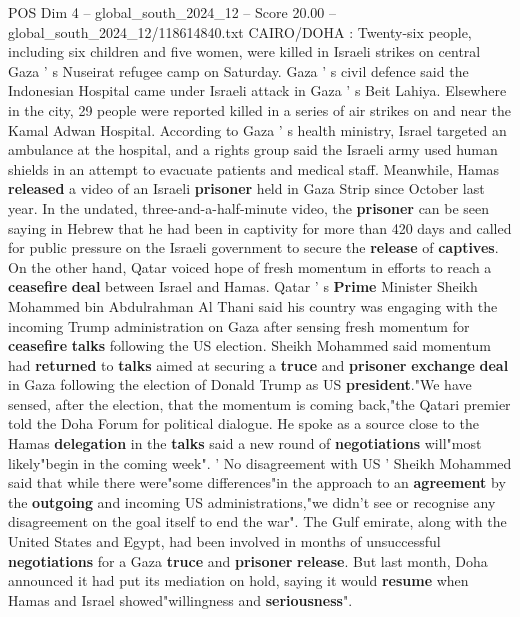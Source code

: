 \begin{textsample}{POS Dim 4 – global\_south\_2024\_12 – Score 20.00 – global\_south\_2024\_12/118614840.txt}  \label{ex:f4_pos_254}
CAIRO/DOHA : Twenty-six people, including six children and five women, were killed in Israeli strikes on central Gaza ' s Nuseirat refugee camp on Saturday.
Gaza ' s civil defence said the Indonesian Hospital came under Israeli attack in Gaza ' s Beit Lahiya.
Elsewhere in the city, 29 people were reported killed in a series of air strikes on and near the Kamal Adwan Hospital.
According to Gaza ' s health ministry, Israel targeted an ambulance at the hospital, and a rights group said the Israeli army used human shields in an attempt to evacuate patients and medical staff.
Meanwhile, Hamas \textbf{released} a video of an Israeli \textbf{prisoner} held in Gaza Strip since October last year.
In the undated, three-and-a-half-minute video, the \textbf{prisoner} can be seen saying in Hebrew that he had been in captivity for more than 420 days and called for public pressure on the Israeli government to secure the \textbf{release} of \textbf{captives}.
On the other hand, Qatar voiced hope of fresh momentum in efforts to reach a \textbf{ceasefire} \textbf{deal} between Israel and Hamas.
Qatar ' s \textbf{Prime} Minister Sheikh Mohammed bin Abdulrahman Al Thani said his country was engaging with the incoming Trump administration on Gaza after sensing fresh momentum for \textbf{ceasefire} \textbf{talks} following the US election.
Sheikh Mohammed said momentum had \textbf{returned} to \textbf{talks} aimed at securing a \textbf{truce} and \textbf{prisoner} \textbf{exchange} \textbf{deal} in Gaza following the election of Donald Trump as US \textbf{president}."We have sensed, after the election, that the momentum is coming back,"the Qatari premier told the Doha Forum for political dialogue.
He spoke as a source close to the Hamas \textbf{delegation} in the \textbf{talks} said a new round of \textbf{negotiations} will"most likely"begin in the coming week". ' No disagreement with US ' Sheikh Mohammed said that while there were"some differences"in the approach to an \textbf{agreement} by the \textbf{outgoing} and incoming US administrations,"we didn't see or recognise any disagreement on the goal itself to end the war".
The Gulf emirate, along with the United States and Egypt, had been involved in months of unsuccessful \textbf{negotiations} for a Gaza \textbf{truce} and \textbf{prisoner} \textbf{release}.
But last month, Doha announced it had put its mediation on hold, saying it would \textbf{resume} when Hamas and Israel showed"willingness and \textbf{seriousness}".

\end{textsample}
